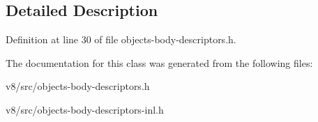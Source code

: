 \subsection{Detailed Description}


Definition at line 30 of file objects-\/body-\/descriptors.\+h.



The documentation for this class was generated from the following files\+:\begin{DoxyCompactItemize}
\item 
v8/src/objects-\/body-\/descriptors.\+h\item 
v8/src/objects-\/body-\/descriptors-\/inl.\+h\end{DoxyCompactItemize}
